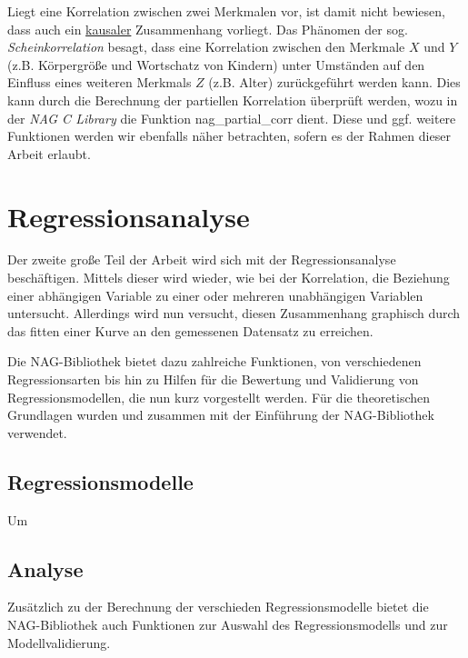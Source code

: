 \documentclass{article}
\begin{document}
Liegt eine Korrelation zwischen zwei Merkmalen vor, ist damit nicht bewiesen, dass auch ein \underline{kausaler} Zusammenhang vorliegt. Das Phänomen der sog. {\it Scheinkorrelation} besagt, dass eine Korrelation zwischen den Merkmale $X$ und $Y$ (z.B. Körpergröße und Wortschatz von Kindern) unter Umständen auf den Einfluss eines weiteren Merkmals $Z$ (z.B. Alter) zurückgeführt werden kann. Dies kann durch die Berechnung der partiellen Korrelation überprüft werden, wozu in der {\it NAG C Library} die Funktion nag\_partial\_corr dient. Diese und ggf. weitere Funktionen werden wir ebenfalls näher betrachten, sofern es der Rahmen dieser Arbeit erlaubt.

\section{Regressionsanalyse}

Der zweite große Teil der Arbeit wird sich mit der Regressionsanalyse beschäftigen.
Mittels dieser wird wieder, wie bei der Korrelation, die Beziehung einer abhängigen Variable zu einer oder mehreren unabhängigen Variablen untersucht.
Allerdings wird nun versucht, diesen Zusammenhang graphisch durch das fitten einer Kurve an den gemessenen Datensatz zu erreichen.

Die NAG-Bibliothek bietet dazu zahlreiche Funktionen, von verschiedenen Regressionsarten bis hin zu Hilfen für die Bewertung und Validierung von Regressionsmodellen, die nun kurz vorgestellt werden.
Für die theoretischen Grundlagen wurden \cite{Cramer2007} und \cite{Fahrmeier2010} zusammen mit der Einführung der NAG-Bibliothek\cite{nag:intro} verwendet.

\subsection{Regressionsmodelle}

Um 

\subsection{Analyse}

Zusätzlich zu der Berechnung der verschieden Regressionsmodelle bietet die NAG-Bibliothek auch Funktionen zur Auswahl des Regressionsmodells und zur Modellvalidierung.
\end{document}
